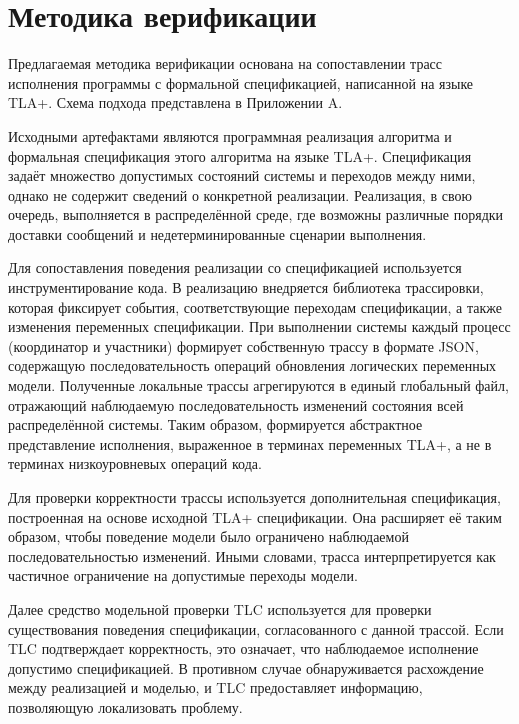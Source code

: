 \section{Методика верификации}

Предлагаемая методика верификации основана на сопоставлении трасс исполнения
программы с формальной спецификацией, написанной на языке TLA+. Схема подхода
представлена в Приложении A.

Исходными артефактами являются программная реализация алгоритма и формальная
спецификация этого алгоритма на языке TLA+. Спецификация задаёт множество
допустимых состояний системы и переходов между ними, однако не содержит
сведений о конкретной реализации. Реализация, в свою очередь, выполняется в
распределённой среде, где возможны различные порядки доставки сообщений и
недетерминированные сценарии выполнения.

Для сопоставления поведения реализации со спецификацией используется
инструментирование кода. В реализацию внедряется библиотека трассировки,
которая фиксирует события, соответствующие переходам спецификации, а также
изменения переменных спецификации. При выполнении системы каждый процесс
(координатор и участники) формирует собственную трассу в формате JSON,
содержащую последовательность операций обновления логических переменных модели.
Полученные локальные трассы агрегируются в единый глобальный файл, отражающий
наблюдаемую последовательность изменений состояния всей распределённой системы.
Таким образом, формируется абстрактное представление исполнения, выраженное в
терминах переменных TLA+, а не в терминах низкоуровневых операций кода.

Для проверки корректности трассы используется дополнительная спецификация,
построенная на основе исходной TLA+ спецификации. Она расширяет её таким
образом, чтобы поведение модели было ограничено наблюдаемой последовательностью
изменений. Иными словами, трасса интерпретируется как частичное ограничение на
допустимые переходы модели.

Далее средство модельной проверки TLC используется для проверки существования
поведения спецификации, согласованного с данной трассой. Если TLC подтверждает
корректность, это означает, что наблюдаемое исполнение допустимо спецификацией.
В противном случае обнаруживается расхождение между реализацией и моделью, и
TLC предоставляет информацию, позволяющую локализовать проблему.

